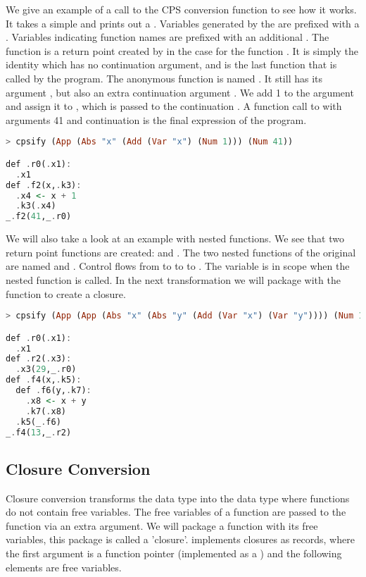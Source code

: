 {We give an example of a call to the \ac{CPS} conversion function to see how it works. It takes a simple  and prints out a . Variables generated by the  are prefixed with a . Variables indicating function names are prefixed with an additional \icode{_}. The function  is a return point created by  in the  case for the function . It is simply the identity which has no continuation argument, and is the last function that is called by the program. The anonymous function is named . It still has its argument , but also an extra continuation argument . We add 1 to the argument  and assign it to , which is passed to the continuation . A function call to  with arguments 41 and continuation  is the final expression of the program.

\begin{lstlisting}[language=Haskell]
> cpsify (App (Abs "x" (Add (Var "x") (Num 1))) (Num 41))

def .r0(.x1):
  .x1
def .f2(x,.k3):
  .x4 <- x + 1
  .k3(.x4)
_.f2(41,_.r0)
\end{lstlisting}

We will also take a look at an example with nested functions. We see that two return point functions are created:  and . The two nested functions of the original  are named  and . Control flows from  to  to  to . The variable  is in scope when the nested function  is called. In the next transformation we will package  with the function  to create a closure.

\begin{lstlisting}[language=Haskell]
> cpsify (App (App (Abs "x" (Abs "y" (Add (Var "x") (Var "y")))) (Num 13)) (Num 29))

def .r0(.x1):
  .x1
def .r2(.x3):
  .x3(29,_.r0)
def .f4(x,.k5):
  def .f6(y,.k7):
    .x8 <- x + y
    .k7(.x8)
  .k5(_.f6)
_.f4(13,_.r2)
\end{lstlisting}

\subsection{\label{section:closconvert}Closure Conversion}
Closure conversion transforms the  data type into the  data type where functions do not contain free variables. The free variables of a function are passed to the function via an extra argument. We will package a function with its free variables, this package is called a 'closure'.  implements closures as records, where the first argument is a function pointer (implemented as a ) and the following elements are free variables.

}
